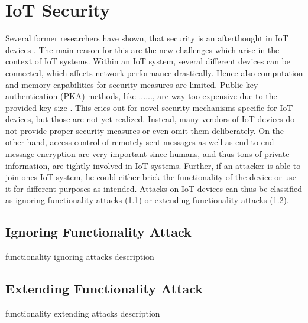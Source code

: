 \section{IoT Security}
\label{sec:iot_security}


Several former researchers have shown, that security is an afterthought in IoT devices \cite{Morgner:2016:AYBBUICSSCLS, Zhang:2017:UISTDCBWWNaWWG, Restuccia:2018:SITNPaRC, Angrishi:2017:TitiiiviIb, Grau:2015:Ctyf, Kolias:2017:DIMaOB}. The main reason for this are the new challenges which arise in the context of IoT systems.
Within an IoT system, several different devices can be connected, which affects network performance drastically. Hence also computation and memory capabilities for security measures are limited. Public key authentication (PKA) methods, like ......, are way too expensive due to the provided key size \cite{Restuccia:2018:SITNPaRC}. This cries out for novel security mechanisms specific for IoT devices, but those are not yet realized. Instead, many vendors of IoT devices do not provide proper security measures or even omit them deliberately. On the other hand, access control of remotely sent messages as well as end-to-end message encryption are very important since humans, and thus tons of private information, are tightly involved in IoT systems. 
Further, if an attacker is able to join ones IoT system, he could either brick the functionality of the device or use it for different purposes as intended. Attacks on IoT devices can thus be classified as ignoring functionality attacks (\ref{sec:ignoring_func}) or extending functionality attacks (\ref{sec:extending_func}).

\subsection{Ignoring Functionality Attack}
\label{sec:ignoring_func}

functionality ignoring attacks description

\subsection{Extending Functionality Attack}
\label{sec:extending_func}

functionality extending attacks description
